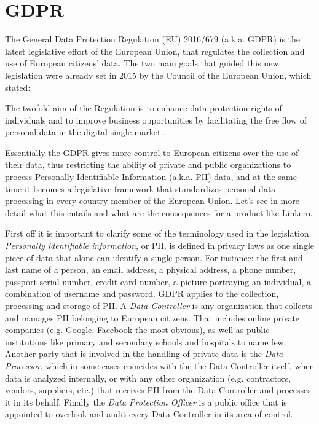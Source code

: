 \section{GDPR}
The General Data Protection Regulation (EU) 2016/679 (a.k.a. GDPR) is the latest
legislative effort of the European Union, that regulates the collection
and use of European citizens' data. The two main goals that guided this new
legislation were already set in 2015 by the Council of the European Union, which
stated:
\begin{displayquote}
The twofold aim of the Regulation is to enhance data
protection rights of individuals and to improve business opportunities by facilitating the free
flow of personal data in the digital single market \cite{CoEU956515}.
\end{displayquote}
Essentially the GDPR gives more control to European citizens over the use of
their data, thus restricting the ability of private and public organizations to
process Personally Identifiable Information (a.k.a. PII) data, and at the same
time it becomes a legislative framework that standardizes personal data
processing in every country member of the European Union. Let's see in more
detail what this entails and what are the consequences for a product like
Linkero.

First off it is important to clarify some of the terminology used in the
legislation. \emph{Personally identifiable information}, or PII, is defined in
privacy laws as one single piece of data that alone can identify a single person. For
instance: the first and last name of a person, an email address, a physical
address, a phone number, passport serial number, credit card number, a picture portraying an
individual, a combination of username and password. GDPR applies to the
collection, processing and storage of PII. A \emph{Data Controller} is any
organization that collects and manages PII belonging to European citizens. That
includes online private companies (e.g. Google, Facebook the most obvious), as well as
public institutions like primary and secondary schools and hospitals to name
few. Another party that is involved in the handling of private data is the
\emph{Data Processor}, which in some cases coincides with the the Data
Controller itself, when data is analyzed internally, or with any other organization (e.g.
contractors, vendors, suppliers, etc.) that receives PII from the Data Controller
and processes it in its behalf. Finally the \emph{Data Protection Officer} is a
public office that is appointed to overlook and audit every Data Controller in
its area of control.

